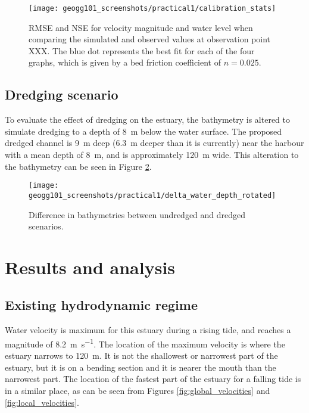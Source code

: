 \documentclass{article}
\begin{document}
\begin{figure}[hbp]
    \centering
    \texttt{[image: geogg101\_screenshots/practical1/calibration\_stats]}
    \caption{RMSE and NSE for velocity magnitude and water level when comparing the simulated and observed values at observation point XXX. The blue dot represents the best fit for each of the four graphs, which is given by a bed friction coefficient of $n = 0.025$.}
    \label{fig:calibration_stats}
\end{figure}

\newpage
\subsection{Dredging scenario}

To evaluate the effect of dredging on the estuary, the bathymetry is altered to simulate dredging to a depth of \SI{8}{m} below the water surface. The proposed dredged channel is \SI{9}{m} deep (\SI{6.3}{m} deeper than it is currently) near the harbour with a mean depth of \SI{8}{m}, and is approximately \SI{120}{m} wide. This alteration to the bathymetry can be seen in Figure \ref{fig:delta_depth}.

\begin{figure}[hbp]
    \centering
    \texttt{[image: geogg101\_screenshots/practical1/delta\_water\_depth\_rotated]}
    \caption{Difference in bathymetries between undredged and dredged scenarios.}
    \label{fig:delta_depth}
\end{figure}

\newpage
\section{Results and analysis}

\subsection{Existing hydrodynamic regime}

Water velocity is maximum for this estuary during a rising tide, and reaches a magnitude of \SI{8.2}{m.s^{-1}}. The location of the maximum velocity is where the estuary narrows to \SI{120}{m}. It is not the shallowest or narrowest part of the estuary, but it is on a bending section and it is nearer the mouth than the narrowest part. The location of the fastest part of the estuary for a falling tide is in a similar place, as can be seen from Figures \ref{fig:global_velocities} and \ref{fig:local_velocities}.
\end{document}
